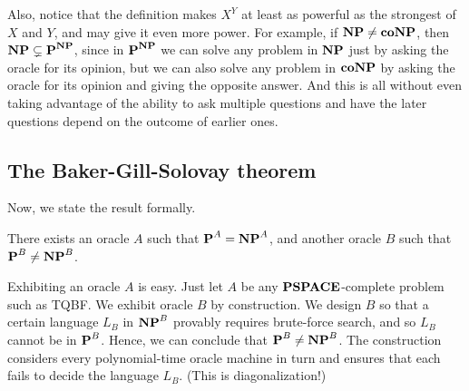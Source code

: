 Also, notice that the definition makes $X^Y$ at least as powerful as the strongest of $X$ and $Y$, and may give it even more power. For example, if $\textbf{NP} \neq \textbf{coNP}$, then $\textbf{NP} \subsetneq \textbf{P}^{\textbf{NP}}$, since in $\textbf{P}^{\textbf{NP}}$ we can solve any problem in $\textbf{NP}$ just by asking the oracle for its opinion, but we can also solve any problem in $\textbf{coNP}$ by asking the oracle for its opinion and giving the opposite answer. And this is all without even taking advantage of the ability to ask multiple questions and have the later questions depend on the outcome of earlier ones.

\subsection{The Baker-Gill-Solovay theorem}
Now, we state the result formally.
\begin{theorem}
  There exists an oracle $A$ such that $\textbf{P}^A = \textbf{NP}^A$, and another oracle $B$ such that $\textbf{P}^B \neq \textbf{NP}^B$.
\end{theorem}

\begin{proofidea}
  Exhibiting an oracle $A$ is easy. Just let $A$ be any $\textbf{PSPACE}$-complete problem such as TQBF. We exhibit oracle $B$ by construction. We design $B$ so that a certain language $L_B$ in $\textbf{NP}^B$ provably requires brute-force search, and so $L_B$ cannot be in $\textbf{P}^B$. Hence, we can conclude that $\textbf{P}^B \neq \textbf{NP}^B$. The construction considers every polynomial-time oracle machine in turn and ensures that each fails to decide the language $L_B$. (This is diagonalization!)
\end{proofidea}

